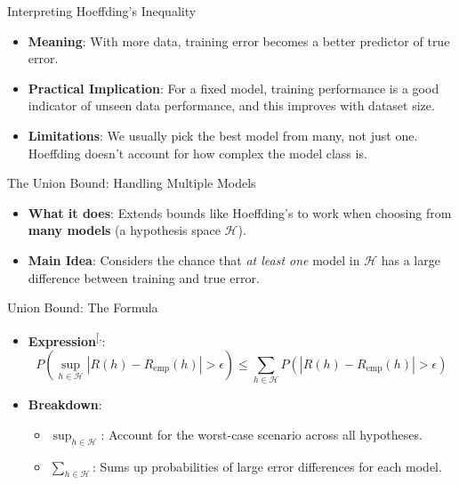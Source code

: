 \documentclass[
  ignorenonframetext,
]{beamer}
\providecommand{\tightlist}{%
  \setlength{\itemsep}{0pt}\setlength{\parskip}{0pt}}\usepackage{longtable,booktabs,array}
\begin{document}
\begin{frame}{Interpreting Hoeffding's Inequality}
\label{interpreting-hoeffdings-inequality}
\begin{itemize}
\tightlist
\item
  \textbf{Meaning}: With more data, training error becomes a better
  predictor of true error.
\item
  \textbf{Practical Implication}: For a fixed model, training
  performance is a good indicator of unseen data performance, and this
  improves with dataset size.
\item
  \textbf{Limitations}: We usually pick the best model from many, not
  just one. Hoeffding doesn't account for how complex the model class
  is.
\end{itemize}
\end{frame}

\begin{frame}{The Union Bound: Handling Multiple Models}
\label{the-union-bound-handling-multiple-models}
\begin{itemize}
\tightlist
\item
  \textbf{What it does}: Extends bounds like Hoeffding's to work when
  choosing from \textbf{many models} (a hypothesis space
  \(\mathcal{H}\)).
\item
  \textbf{Main Idea}: Considers the chance that \emph{at least one}
  model in \(\mathcal{H}\) has a large difference between training and
  true error.
\end{itemize}
\end{frame}

\begin{frame}{Union Bound: The Formula}
\label{union-bound-the-formula}
\begin{itemize}
\tightlist
\item
  \textbf{Expression}\textsuperscript{{[},\citeproc{ref-samir16}{4}{]}}:
  \[
  P\left(\sup_{h \in \mathcal{H}} |R(h) - R_{\text{emp}}(h)| > \epsilon \right) \leq \sum_{h \in \mathcal{H}} P\left(|R(h) - R_{\text{emp}}(h)| > \epsilon \right)
  \]
\item
  \textbf{Breakdown}:

  \begin{itemize}
  \tightlist
  \item
    \(\sup_{h \in \mathcal{H}}\): Account for the worst-case scenario
    across all hypotheses.
  \item
    \(\sum_{h \in \mathcal{H}}\): Sums up probabilities of large error
    differences for each model.
  \end{itemize}
\end{itemize}
\end{frame}
\end{document}
